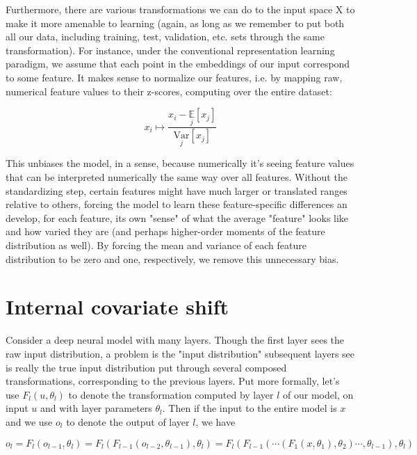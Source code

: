 \documentclass{article}
\begin{document}
Furthermore, there are various transformations we can do to the input space X to make it more amenable to learning (again, as long as we remember to put both all our data, including training, test, validation, etc. sets through the same transformation). For instance, under the conventional representation learning paradigm, we assume that each point in the embeddings of our input correspond to some feature. It makes sense to normalize our features, i.e. by mapping raw, numerical feature values to their z-scores, computing over the entire dataset:

    $$ x_i \mapsto \frac{x_i - \underset{j}{\mathbb{E}} [x_j]}{\underset{j}{\text{Var}} [x_j]} $$

This unbiases the model, in a sense, because numerically it's seeing feature values that can be interpreted numerically the same way over all features. Without the standardizing step, certain features might have much larger or translated ranges relative to others, forcing the model to learn these feature-specific differences an develop, for each feature, its own "sense" of what the average "feature" looks like and how varied they are (and perhaps higher-order moments of the feature distribution as well). By forcing the mean and variance of each feature distribution to be zero and one, respectively, we remove this unnecessary bias.

\section{Internal covariate shift}
Consider a deep neural model with many layers. Though the first layer sees the raw input distribution, a problem is the "input distribution" subsequent layers see is really the true input distribution put through several composed transformations, corresponding to the previous layers. Put more formally, let's use $ F_l(u, \theta_l) $ to denote the transformation computed by layer $ l $ of our model, on input $ u $ and with layer parameters $ \theta_l $. Then if the input to the entire model is $ x $ and we use $ o_l $ to denote the output of layer $ l $, we have

    $$ o_l = F_l(o_{l - 1}, \theta_l) = F_l(F_{l - 1}(o_{l - 2}, \theta_{l - 1}), \theta_l) = F_l(F_{l - 1}( \cdots (F_1(x, \theta_1), \theta_2) \cdots, \theta_{l - 1} ), \theta_l) $$
\end{document}
